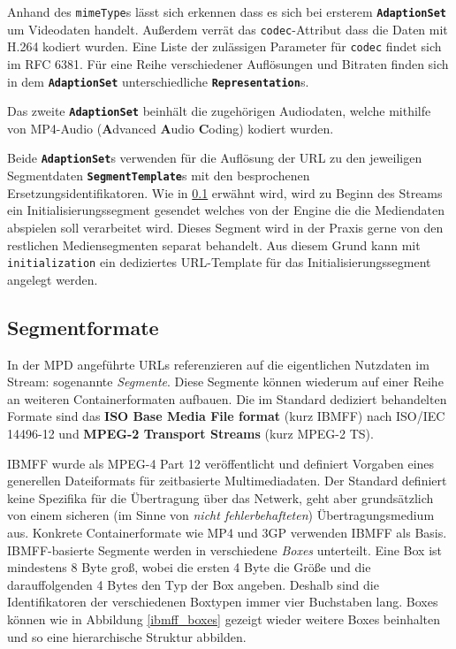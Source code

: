 \documentclass[paper = a4, fontsize = 12pt, parskip = half]{scrartcl} %
\def\attr#1{\texttt{#1}}
\def\elem#1{\texttt{\textbf{#1}}}
\begin{document}
Anhand des \attr{mimeType}s lässt sich erkennen dass es sich bei ersterem \elem{AdaptionSet} um Videodaten handelt. Außerdem verrät das \attr{codec}-Attribut dass die Daten mit H.264 kodiert wurden. Eine Liste der zulässigen Parameter für \attr{codec} findet sich im RFC 6381. Für eine Reihe verschiedener Auflösungen und Bitraten finden sich in dem \elem{AdaptionSet} unterschiedliche \elem{Representation}s.

Das zweite \elem{AdaptionSet} beinhält die zugehörigen Audiodaten, welche mithilfe von MP4-Audio (\textbf{A}dvanced \textbf{A}udio \textbf{C}oding) kodiert wurden.

Beide \elem{AdaptionSet}s verwenden für die Auflösung der URL zu den jeweiligen Segmentdaten \elem{SegmentTemplate}s mit den besprochenen Ersetzungsidentifikatoren. Wie in \ref{segment_formats} erwähnt wird, wird zu Beginn des Streams ein Initialisierungssegment gesendet welches von der Engine die die Mediendaten abspielen soll verarbeitet wird. Dieses Segment wird in der Praxis gerne von den restlichen Mediensegmenten separat behandelt. Aus diesem Grund kann mit \attr{initialization} ein dediziertes URL-Template für das Initialisierungssegment angelegt werden.


\subsection{Segmentformate}
\label{segment_formats}
In der MPD angeführte URLs referenzieren auf die eigentlichen Nutzdaten im Stream: sogenannte \textit{Segmente}. Diese Segmente können wiederum auf einer Reihe an weiteren Containerformaten aufbauen. Die im Standard dediziert behandelten Formate sind das \textbf{ISO Base Media File format} (kurz IBMFF) nach ISO/IEC 14496-12 und \textbf{MPEG-2 Transport Streams} (kurz MPEG-2 TS).

IBMFF wurde als MPEG-4 Part 12 veröffentlicht und definiert Vorgaben eines generellen Dateiformats für zeitbasierte Multimediadaten. Der Standard definiert keine Spezifika für die Übertragung über das Netwerk, geht aber grundsätzlich von einem sicheren (im Sinne von \textit{nicht fehlerbehafteten}) Übertragungsmedium aus. Konkrete Containerformate wie MP4 und 3GP verwenden IBMFF als Basis. IBMFF-basierte Segmente werden in verschiedene \textit{Boxes} unterteilt. Eine Box ist mindestens 8 Byte groß, wobei die ersten 4 Byte die Größe und die darauffolgenden 4 Bytes den Typ der Box angeben. Deshalb sind die Identifikatoren der verschiedenen Boxtypen immer vier Buchstaben lang. Boxes können wie in Abbildung \ref{ibmff_boxes} gezeigt wieder weitere Boxes beinhalten und so eine hierarchische Struktur abbilden.
\end{document}
